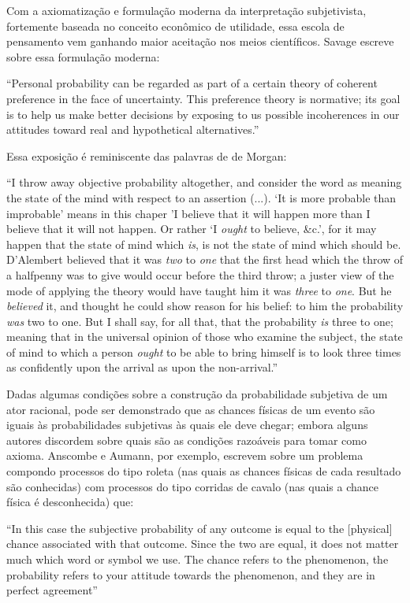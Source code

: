 \documentclass[12pt,a4paper]{article}
\begin{document}
Com a axiomatização e formulação moderna da interpretação subjetivista, fortemente baseada no conceito econômico de utilidade,
essa escola de pensamento vem ganhando maior aceitação nos meios científicos. Savage escreve sobre essa formulação moderna:

``Personal probability can be regarded as part of a certain theory of coherent preference in the face of uncertainty. This
preference theory is normative; its goal is to help us make better decisions by exposing to us possible incoherences in our
attitudes toward real and hypothetical alternatives.''\cite{Savage67}

Essa exposição é reminiscente das palavras de de Morgan:

``I throw away objective probability altogether, and consider the word as meaning the state of the mind with respect to an 
assertion (...). `It is more probable than improbable' means in this chaper 'I believe that it will happen more than I 
believe that it will not happen. Or rather `I {\em ought} to believe, \&c.', for it may happen that the state of mind which {\em
is}, is not the state of mind which should be. 
D'Alembert believed that it was {\em two} to {\em one} that the first head which the throw of a halfpenny was to give would occur
before the third throw; a juster view of the mode of applying the theory would have taught him it was {\em three} to {\em one}.
But he {\em believed} it, and thought he could show reason for his belief: to him the probability {\em was} two to one. But 
I shall say, for all that, that the probability {\em is} three to one; meaning that in the universal opinion of those who
examine the subject, the state of mind to which a person {\em ought} to be able to bring himself is to look three times
as confidently upon the arrival as upon the non-arrival.''\cite{deMorgan1847}

Dadas algumas condições sobre a construção da
probabilidade subjetiva de um ator racional, pode ser demonstrado que as chances físicas de um evento são iguais 
às probabilidades subjetivas às quais ele deve chegar; embora
alguns autores discordem sobre quais são as condições razoáveis para tomar como axioma. Anscombe e Aumann, por exemplo,
escrevem sobre um problema compondo processos do tipo roleta (nas quais as chances físicas de cada resultado são conhecidas) 
com processos do tipo corridas de cavalo (nas quais a chance física é desconhecida) que:

``In this case the subjective probability of any outcome is equal to the [physical] chance associated with that outcome.
Since the two are equal, it does not matter much which word or symbol we use. The
chance refers to the phenomenon, the probability refers to your attitude
towards the phenomenon, and they are in perfect agreement''\cite{Anscombe63}
\end{document}

